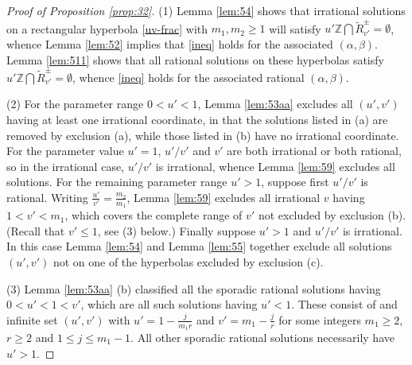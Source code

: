 \documentclass[12pt,letterpaper, reqno]{amsart}
\theoremstyle{definition}
\theoremstyle{remark}
\newcommand{\ZZ}{\ensuremath{\mathbb{Z}}}
\newcommand{\uu}{{u'}}
\newcommand{\vv}{{v'}}
\begin{document}
\begin{proof}[Proof of Proposition \ref{prop:32}]
(1) Lemma \ref{lem:54} shows that irrational solutions on a rectangular hyperbola \eqref{uv-frac} with $m_1, m_2 \ge 1$
will satisfy ${\uu} \ZZ \bigcap \widetilde{R}_{\vv}^{\pm} = \emptyset$, whence Lemma \ref{lem:52} implies that
\eqref{ineq}  holds for the associated $(\alpha, \beta)$. 
 Lemma \ref{lem:511} shows that all rational solutions on these hyperbolas
 satisfy ${\uu} \ZZ \bigcap  \widetilde{R}_{\vv}^{\pm} = \emptyset$, whence \eqref{ineq} holds for the associated 
 rational $(\alpha, \beta)$.
 
 (2) For the parameter range $0 < {\uu} <1$, Lemma \ref{lem:53aa} excludes all $(\uu,\vv)$ having at least one irrational coordinate,
 in that the solutions listed in (a) are removed by exclusion (a), while those listed in (b) have no irrational coordinate. For the parameter
  value ${\uu}=1$,  $\uu/\vv$ and $\vv$ are both irrational or both rational, so in  the irrational case, $\uu/\vv$ is irrational, whence Lemma \ref{lem:59}
 excludes all solutions. For the remaining parameter range ${\uu} >1$, suppose first $\uu/\vv$ is rational. Writing $\frac\uu\vv= \frac{m_2}{m_1}$, 
 Lemma \ref{lem:59} excludes all irrational $v$ having $1 < \vv <m_1$,
 which covers the complete range of $\vv$  not excluded by exclusion (b). (Recall that $\vv \le 1$, see (3) below.) 
 Finally suppose ${\uu} >1$ and $\uu/\vv$ is irrational. In this case Lemma \ref{lem:54} 
 and Lemma \ref{lem:55} together exclude all solutions $(\uu, \vv)$ not on one of the hyperbolas excluded by exclusion (c).
 
 (3)  
Lemma \ref{lem:53aa} (b) classified all the sporadic rational solutions having $0< \uu <1< \vv$, which are all such solutions having ${\uu} <1$.
 These consist of  and infinite set $(\uu, \vv)$ with
 $\uu= 1-\frac{j}{m_1r}$ and  $\vv = m_1-\frac{j}{r}$ for some integers $ m_1 \ge 2$,  $r\geq 2$ and $1\le j\le m_1-1$.
All other sporadic rational solutions necessarily  have ${\uu} > 1$.
\end{proof}

%
%
\end{document}
